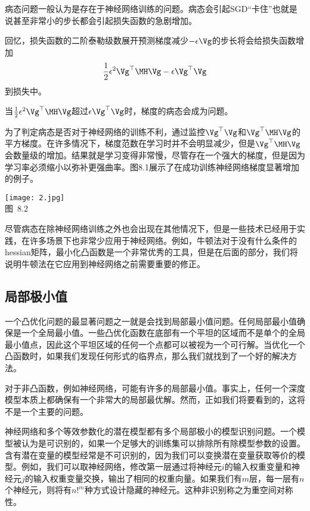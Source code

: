 病态问题一般认为是存在于神经网络训练的问题。病态会引起SGD“卡住”也就是说甚至非常小的步长都会引起损失函数的急剧增加。

回忆，损失函数的二阶泰勒级数展开预测梯度减少$-\epsilon\Vg$的步长将会给损失函数增加
\begin{equation}
    \frac{1}{2} \epsilon^2 \Vg^\top \MH\Vg - \epsilon\Vg^\top\Vg
\end{equation}
到损失中。

当$\frac{1}{2} \epsilon^2 \Vg^\top\MH\Vg$超过$\epsilon\Vg^\top\Vg$时，梯度的病态会成为问题。

为了判定病态是否对于神经网络的训练不利，通过监控$\Vg^\top\Vg$和$\Vg^\top \MH\Vg$的平方梯度。在许多情况下，梯度范数在学习时并不会明显减少，但是$\Vg^\top\MH\Vg$会数量级的增加。结果就是学习变得非常慢，尽管存在一个强大的梯度，但是因为学习率必须缩小以弥补更强曲率。图8.1展示了在成功训练神经网络梯度显著增加的例子。

\begin{center}
\texttt{[image: 2.jpg]}\\
图~8.2
\end{center}

尽管病态在除神经网络训练之外也会出现在其他情况下，但是一些技术已经用于实践，在许多场景下也非常少应用于神经网络。例如，牛顿法对于没有什么条件的\gls{hessian}矩阵，最小化凸函数是一个非常优秀的工具，但是在后面的部分，我们将说明牛顿法在它应用到神经网络之前需要重要的修正。

\subsection{局部极小值}
一个凸优化问题的最显著问题之一就是会找到局部最小值问题。任何局部最小值确保是一个全局最小值。一些凸优化函数在底部有一个平坦的区域而不是单个的全局最小值点，因此这个平坦区域的任何一个点都可以被视为一个可行解。当优化一个凸函数时，如果我们发现任何形式的临界点，那么我们就找到了一个好的解决方法。

对于非凸函数，例如神经网络，可能有许多的局部最小值。事实上，任何一个深度模型本质上都确保有一个非常大的局部最优解。然而，正如我们将要看到的，这将不是一个主要的问题。

神经网络和多个等效参数化的潜在模型都有多个局部极小的模型识别问题。一个模型被认为是可识别的，如果一个足够大的训练集可以排除所有除模型参数的设置。含有潜在变量的模型经常是不可识别的，因为我们可以变换潜在变量获取等价的模型。例如，我们可以取神经网络，修改第一层通过将神经元$i$的输入权重变量和神经元$j$的输入权重变量交换，输出了相同的权重向量。如果我们有$m$层，每一层有$n$个神经元，则将有$n!^m$种方式设计隐藏的神经元。这种非识别称之为重空间对称性。

